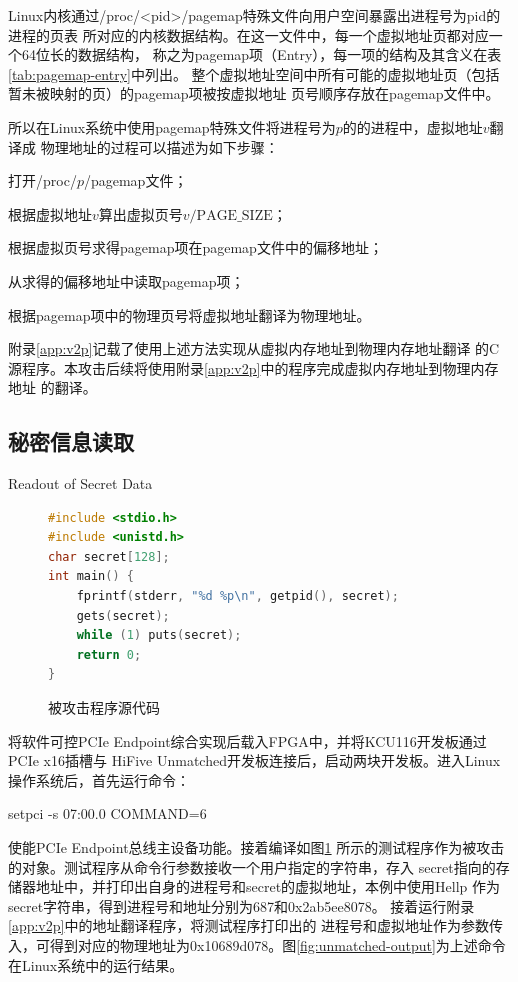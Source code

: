 Linux内核通过/proc/<pid>/pagemap特殊文件向用户空间暴露出进程号为pid的进程的页表
所对应的内核数据结构。在这一文件中，每一个虚拟地址页都对应一个64位长的数据结构，
称之为pagemap项（Entry），每一项的结构及其含义在表\ref{tab:pagemap-entry}中列出。
整个虚拟地址空间中所有可能的虚拟地址页（包括暂未被映射的页）的pagemap项被按虚拟地址
页号顺序存放在pagemap文件中。\cite{pagemap}

所以在Linux系统中使用pagemap特殊文件将进程号为$p$的的进程中，虚拟地址$v$翻译成
物理地址的过程可以描述为如下步骤：
\begin{compactenum}
	\item 打开/proc/$p$/pagemap文件；
	\item 根据虚拟地址$v$算出虚拟页号$v / \text{PAGE\_SIZE}$；
	\item 根据虚拟页号求得pagemap项在pagemap文件中的偏移地址；
	\item 从求得的偏移地址中读取pagemap项；
	\item 根据pagemap项中的物理页号将虚拟地址翻译为物理地址。
\end{compactenum}

附录\ref{app:v2p}记载了使用上述方法实现从虚拟内存地址到物理内存地址翻译
的C源程序。本攻击后续将使用附录\ref{app:v2p}中的程序完成虚拟内存地址到物理内存地址
的翻译。

\subsection{秘密信息读取}{Readout of Secret Data}

\begin{figure}[ht]
	\centering
	\begin{lstlisting}[language=c, escapechar=|]
#include <stdio.h>
#include <unistd.h>
char secret[128];
int main() {
	fprintf(stderr, "%d %p\n", getpid(), secret);
	gets(secret);
	while (1) puts(secret);
	return 0;
}
	\end{lstlisting}
	\caption{被攻击程序源代码}
	\label{fig:target-src}
\end{figure}

将软件可控PCIe Endpoint综合实现后载入FPGA中，并将KCU116开发板通过PCIe x16插槽与
HiFive Unmatched开发板连接后，启动两块开发板。进入Linux操作系统后，首先运行命令：

setpci -s 07:00.0 COMMAND=6

\noindent 使能PCIe Endpoint总线主设备功能。接着编译如图\ref{fig:target-src}
所示的测试程序作为被攻击的对象。测试程序从命令行参数接收一个用户指定的字符串，存入
secret指向的存储器地址中，并打印出自身的进程号和secret的虚拟地址，本例中使用Hellp
作为secret字符串，得到进程号和地址分别为687和0x2ab5ee8078。
接着运行附录\ref{app:v2p}中的地址翻译程序，将测试程序打印出的
进程号和虚拟地址作为参数传入，可得到对应的物理地址为0x10689d078。图\ref{fig:unmatched-output}为上述命令
在Linux系统中的运行结果。

